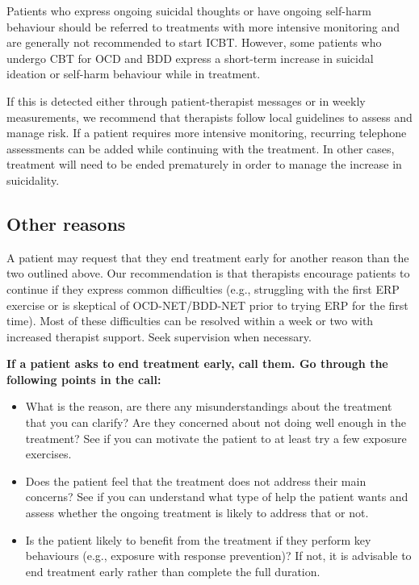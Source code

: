 \documentclass[]{book}
\providecommand{\tightlist}{%
  \setlength{\itemsep}{0pt}\setlength{\parskip}{0pt}}
\theoremstyle{definition}
\theoremstyle{definition}
\theoremstyle{definition}
\theoremstyle{remark}
\begin{document}
Patients who express ongoing suicidal thoughts or have ongoing self-harm
behaviour should be referred to treatments with more intensive
monitoring and are generally not recommended to start ICBT. However,
some patients who undergo CBT for OCD and BDD express a short-term
increase in suicidal ideation or self-harm behaviour while in treatment.

If this is detected either through patient-therapist messages or in
weekly measurements, we recommend that therapists follow local
guidelines to assess and manage risk. If a patient requires more
intensive monitoring, recurring telephone assessments can be added while
continuing with the treatment. In other cases, treatment will need to be
ended prematurely in order to manage the increase in suicidality.

\hypertarget{other-reasons}{%
\subsection{Other reasons}\label{other-reasons}}

A patient may request that they end treatment early for another reason
than the two outlined above. Our recommendation is that therapists
encourage patients to continue if they express common difficulties
(e.g., struggling with the first ERP exercise or is skeptical of
OCD-NET/BDD-NET prior to trying ERP for the first time). Most of these
difficulties can be resolved within a week or two with increased
therapist support. Seek supervision when necessary.

\textbf{If a patient asks to end treatment early, call them. Go through
the following points in the call:}

\begin{itemize}
\tightlist
\item
  What is the reason, are there any misunderstandings about the
  treatment that you can clarify? Are they concerned about not doing
  well enough in the treatment? See if you can motivate the patient to
  at least try a few exposure exercises.\\
\item
  Does the patient feel that the treatment does not address their main
  concerns? See if you can understand what type of help the patient
  wants and assess whether the ongoing treatment is likely to address
  that or not.\\
\item
  Is the patient likely to benefit from the treatment if they perform
  key behaviours (e.g., exposure with response prevention)? If not, it
  is advisable to end treatment early rather than complete the full
  duration.
\end{itemize}
\end{document}
